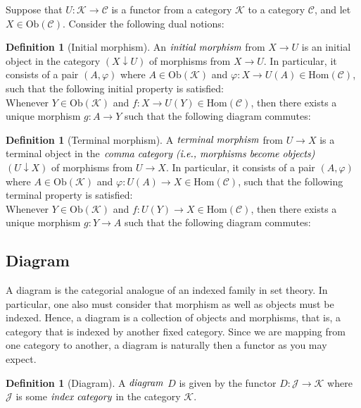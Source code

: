 \documentclass[10pt, oneside, reqno]{amsart}
\theoremstyle{plain}%
\theoremstyle{definition}
\newtheorem{defn}[thm]{Definition}
\theoremstyle{remark}
\begin{document}
Suppose that $U: \mathcal{K} \to \mathcal{C}$ is a functor from a category $\mathcal{K}$ to a category $\mathcal{C}$,
and let $X \in \text{Ob}(\mathcal{C})$. Consider the following dual notions:
\begin{defn}[Initial morphism]
 An $\emph{initial morphism}$ from $X \to U$ is an initial object in the category
 $(X \downarrow U)$ of morphisms from $X \to U$. In particular, it consists
 of a pair $(A, \varphi)$ where $A \in \text{Ob}(\mathcal{K})$ and $\varphi: X \to U(A) \in \text{Hom}(\mathcal{C})$,
 such that the following initial property is satisfied:
 \\
 Whenever $Y \in \text{Ob}(\mathcal{K})$ and $f: X \to U(Y) \in \text{Hom}(\mathcal{C})$, then there exists a unique morphism
 $g: A \to Y$ such that the following diagram commutes:
\end{defn}

\begin{defn}[Terminal morphism]
 A $\emph{terminal morphism}$ from $U \to X$ is a terminal object in the $\emph{comma category (i.e., morphisms become objects)}$
 $(U \downarrow X)$ of morphisms from $U \to X$. In particular, it consists of a pair $(A, \varphi)$
 where $A \in \text{Ob}(\mathcal{K})$ and $\varphi: U(A) \to X \in \text{Hom}(\mathcal{C})$,
 such that the following terminal property is satisfied:
 \\
 Whenever $Y \in \text{Ob}(\mathcal{K})$ and $f: U(Y) \to X \in \text{Hom}(\mathcal{C})$, then there exists a unique morphism
 $g: Y \to A$ such that the following diagram commutes:
\end{defn}

\subsection{Diagram} %
\label{subsec:diagram}
A diagram is the categorial analogue of an indexed family in set theory. In particular, one also must consider that
morphism as well as objects must be indexed. Hence, a diagram is a collection of objects and morphisms, that is,
a category that is indexed by another fixed category. Since we are mapping from one category to another, a diagram is
naturally then a functor as you may expect.
\begin{defn}[Diagram]
 A $\emph{diagram}$ $D$ is given by the functor $D: \mathcal{J} \to \mathcal{K}$
 where $\mathcal{J}$ is some $\emph{index category}$ in the category $\mathcal{K}$.
\end{defn}
\end{document}
